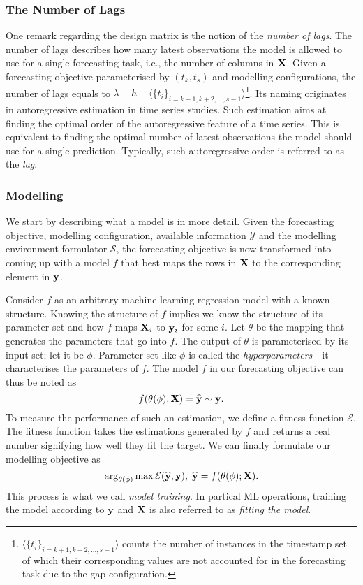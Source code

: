 \subsubsection{The Number of Lags}
One remark regarding the design matrix is the notion of the \textit{number of lags}. The number of lags describes how many latest observations the model is allowed to use for a single forecasting task, i.e., the number of columns in $\mathbf{X}$. Given a forecasting objective parameterised by $(t_k, t_s)$ and modelling configurations, the number of lags equals to $\lambda - h - \langle \{ t_i\}_{i = k+1, k+2, \ldots, s-1} \rangle$\footnote{$\langle \{ t_i\}_{i = k+1, k+2, \ldots, s-1} \rangle$ counts the number of instances in the timestamp set of which their corresponding values are not accounted for in the forecasting task due to the gap configuration.}. Its naming originates in autoregressive estimation in time series studies. Such estimation aims at finding the optimal order of the autoregressive feature of a time series. This is equivalent to finding the optimal number of latest observations the model should use for a single prediction. Typically, such autoregressive order is referred to as the \textit{lag}.

\subsubsection{Modelling}
We start by describing what a model is in more detail. Given the forecasting objective, modelling configuration, available information $\mathcal{Y}$ and the modelling environment formulator $\mathcal{S}$, the forecasting objective is now transformed into coming up with a model $f$ that best maps the rows in $\mathbf{X}$ to the corresponding element in $\mathbf{y}$.

Consider $f$ as an arbitrary machine learning regression model with a known structure. Knowing the structure of $f$ implies we know the structure of its parameter set and how $f$ maps $\mathbf{X}_i$ to $\mathbf{y}_i$ for some $i$. Let $\theta$ be the mapping that generates the parameters that go into $f$. The output of $\theta$ is parameterised by its input set; let it be $\phi$. Parameter set like $\phi$ is called the \textit{hyperparameters} - it characterises the parameters of $f$. The model $f$ in our forecasting objective can thus be noted as
\begin{equation*}
    f(\theta(\phi); \mathbf{X}) = \widehat{\mathbf{y}} \sim \mathbf{y}.
\end{equation*}
To measure the performance of such an estimation, we define a fitness function $\mathcal{E}$. The fitness function takes the estimations generated by $f$ and returns a real number signifying how well they fit the target. We can finally formulate our modelling objective as
\begin{equation}\label{eq: ml training}
    \arg_{\theta(\phi)} \max \mathcal{E}(\widehat{\mathbf{y}}, \mathbf{y}), \; \widehat{\mathbf{y}} = f(\theta(\phi); \mathbf{X}).
\end{equation}
This process is what we call \textit{model training}. In partical ML operations, training the model according to $\mathbf{y}$ and $\mathbf{X}$ is also referred to as \textit{fitting the model}.


